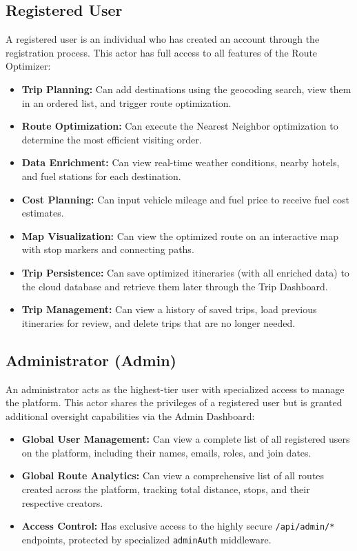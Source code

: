 \subsection{Registered User}
A registered user is an individual who has created an account through the registration process. This actor has full access to all features of the Route Optimizer:
\begin{itemize}
    \item \textbf{Trip Planning:} Can add destinations using the geocoding search, view them in an ordered list, and trigger route optimization.
    \item \textbf{Route Optimization:} Can execute the Nearest Neighbor optimization to determine the most efficient visiting order.
    \item \textbf{Data Enrichment:} Can view real-time weather conditions, nearby hotels, and fuel stations for each destination.
    \item \textbf{Cost Planning:} Can input vehicle mileage and fuel price to receive fuel cost estimates.
    \item \textbf{Map Visualization:} Can view the optimized route on an interactive map with stop markers and connecting paths.
    \item \textbf{Trip Persistence:} Can save optimized itineraries (with all enriched data) to the cloud database and retrieve them later through the Trip Dashboard.
    \item \textbf{Trip Management:} Can view a history of saved trips, load previous itineraries for review, and delete trips that are no longer needed.
\end{itemize}

\subsection{Administrator (Admin)}
An administrator acts as the highest-tier user with specialized access to manage the platform. This actor shares the privileges of a registered user but is granted additional oversight capabilities via the Admin Dashboard:
\begin{itemize}
    \item \textbf{Global User Management:} Can view a complete list of all registered users on the platform, including their names, emails, roles, and join dates.
    \item \textbf{Global Route Analytics:} Can view a comprehensive list of all routes created across the platform, tracking total distance, stops, and their respective creators.
    \item \textbf{Access Control:} Has exclusive access to the highly secure \texttt{/api/admin/*} endpoints, protected by specialized \texttt{adminAuth} middleware.
\end{itemize}

